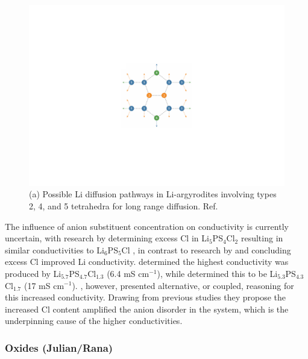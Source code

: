\documentclass[../main.tex]{subfiles}
\begin{document}
\begin{figure}
    \centering
    \includegraphics[scale=0.65]{figures/diffusion_pathways.pdf}
    \caption{(a) Possible Li diffusion pathways in Li-argyrodites involving types 2, 4, and 5 tetrahedra for long range diffusion. Ref. }
    \label{fig:diffusion_pathways}
\end{figure}

The influence of anion substituent concentration on conductivity is currently uncertain, with research by \citeauthor{deklerk2016} determining excess Cl in Li$_5$PS$_4$Cl$_2$ resulting in similar conductivities to Li$_6$PS$_5$Cl \cite{deklerk2016}, in contrast to research by \citeauthor{yu2019tailoring} and \citeauthor{Feng_2020} concluding excess Cl improved Li conductivity. \citeauthor{yu2019tailoring} determined the highest conductivity was produced by Li$_{5.7}$PS$_{4.7}$Cl$_{1.3}$ (6.4 mS cm$^{-1}$), \cite{yu2019tailoring,yu_superionic_2020} while \citeauthor{Feng_2020} determined this to be Li$_{5.3}$PS$_{4.3}$Cl$_{1.7}$ (17 mS cm$^{-1}$). \cite{Feng_2020} \citeauthor{Feng_2020}, however, presented alternative, or coupled, reasoning for this increased conductivity. Drawing from previous studies \cite{adeli2019,zhou_solvent-engineered_2019} they propose the increased Cl content amplified the anion disorder in the system, which is the underpinning cause of the higher conductivities.

\subsubsection{Oxides (Julian/Rana)}
\label{sec:se_oxides}
\end{document}
